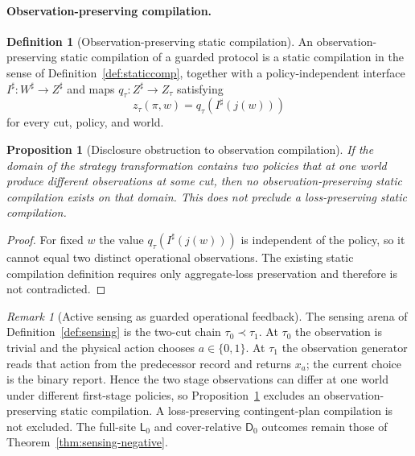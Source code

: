 \documentclass[11pt]{article}
\theoremstyle{plain}
\newtheorem{proposition}[theorem]{Proposition}
\theoremstyle{definition}
\newtheorem{definition}[theorem]{Definition}
\theoremstyle{remark}
\newtheorem{remark}[theorem]{Remark}
\begin{document}
\paragraph{Observation-preserving compilation.}

\begin{definition}[Observation-preserving static compilation]
\label{def:observation-compilation}
An observation-preserving static compilation of a guarded protocol is a static
compilation in the sense of Definition~\ref{def:staticcomp}, together with a
policy-independent interface $I^\sharp:W^\sharp\to Z^\sharp$ and maps
$q_\tau:Z^\sharp\to Z_\tau$ satisfying
\[
z_\tau(\pi,w)=q_\tau(I^\sharp(j(w)))
\]
for every cut, policy, and world.
\end{definition}

\begin{proposition}[Disclosure obstruction to observation compilation]
\label{prop:observation-compilation-no-go}
If the domain of the strategy transformation contains two policies that at one
world produce different observations at some cut, then no observation-preserving
static compilation exists on that domain. This does not preclude a
loss-preserving static compilation.
\end{proposition}

\begin{proof}
For fixed $w$ the value $q_\tau(I^\sharp(j(w)))$ is independent of the policy,
so it cannot equal two distinct operational observations. The existing static
compilation definition requires only aggregate-loss preservation and therefore
is not contradicted.
\end{proof}


\begin{remark}[Active sensing as guarded operational feedback]
\label{rem:sensing-operational}
The sensing arena of Definition~\ref{def:sensing} is the two-cut chain
$\tau_0\prec\tau_1$. At $\tau_0$ the observation is trivial and the physical
action chooses $a\in\{0,1\}$. At $\tau_1$ the observation generator reads that
action from the predecessor record and returns $x_a$; the current choice is the
binary report. Hence the two stage observations can differ at one world under
different first-stage policies, so
Proposition~\ref{prop:observation-compilation-no-go} excludes an
observation-preserving static compilation. A loss-preserving contingent-plan
compilation is not excluded. The full-site $\mathsf L_0$ and cover-relative
$\mathsf D_0$ outcomes remain those of
Theorem~\ref{thm:sensing-negative}.
\end{remark}
\end{document}
